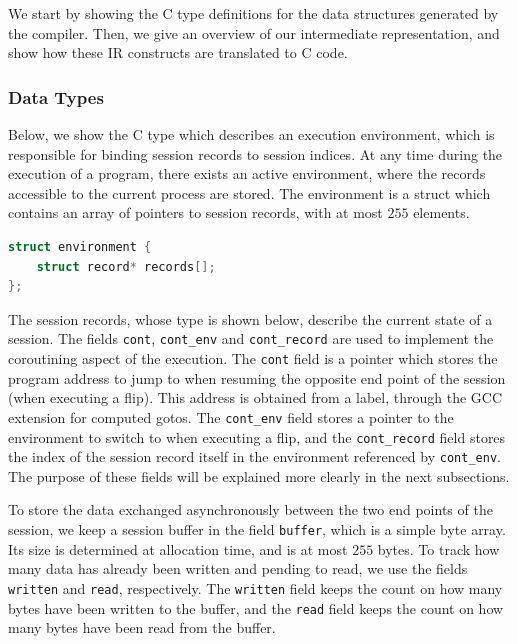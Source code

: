We start by showing the C type definitions for the data structures generated by the compiler. Then, we give an overview of our intermediate representation, and show how these IR constructs are translated to C code.

\subsubsection{Data Types}

Below, we show the C type which describes an execution environment, which is responsible for binding session records to session indices. At any time during the execution of a program, there exists an active environment, where the records accessible to the current process are stored. The environment is a struct which contains an array of pointers to session records, with at most $255$ elements.

\begin{lstlisting}[language=C]
struct environment {
    struct record* records[];
};
\end{lstlisting}

The session records, whose type is shown below, describe the current state of a session. The fields \texttt{cont}, \texttt{cont\_env} and \texttt{cont\_record} are used to implement the coroutining aspect of the execution. The \texttt{cont} field is a pointer which stores the program address to jump to when resuming the opposite end point of the session (when executing a flip). This address is obtained from a label, through the GCC extension for computed gotos. The \texttt{cont\_env} field stores a pointer to the environment to switch to when executing a flip, and the \texttt{cont\_record} field stores the index of the session record itself in the environment referenced by \texttt{cont\_env}. The purpose of these fields will be explained more clearly in the next subsections.

To store the data exchanged asynchronously between the two end points of the session, we keep a session buffer in the field \texttt{buffer}, which is a simple byte array. Its size is determined at allocation time, and is at most $255$ bytes. To track how many data has already been written and pending to read, we use the fields \texttt{written} and \texttt{read}, respectively. The \texttt{written} field keeps the count on how many bytes have been written to the buffer, and the \texttt{read} field keeps the count on how many bytes have been read from the buffer.

